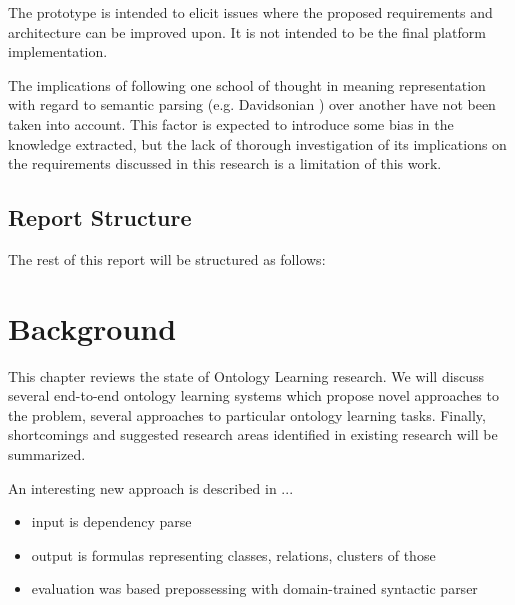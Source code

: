 \documentclass[a4paper]{report}
\begin{document}
The prototype is intended to elicit issues where the proposed requirements and architecture can be improved upon.
It is not intended to be the final platform implementation.

The implications of following one school of thought in meaning representation with regard to semantic parsing (e.g. Davidsonian \cite{DavidsonianSemantics}) over another have not been taken into account.
This factor is expected to introduce some bias in the knowledge extracted, but the lack of thorough investigation of its implications on the requirements discussed in this research is a limitation of this work.

\section{Report Structure}

The rest of this report will be structured as follows:

\chapter{Background}

This chapter reviews the state of Ontology Learning research.
We will discuss several end-to-end ontology learning systems which propose novel approaches to the problem, several approaches to particular ontology learning tasks.
Finally, shortcomings and suggested research areas identified in existing research will be summarized.

An interesting new approach is described in \cite{Poon2010OntoUSP}...
\begin{itemize}
  \item{input is dependency parse}
  \item{output is formulas representing classes, relations, clusters of those}
  \item{evaluation was based prepossessing with domain-trained syntactic parser}
\end{itemize}
\end{document}
